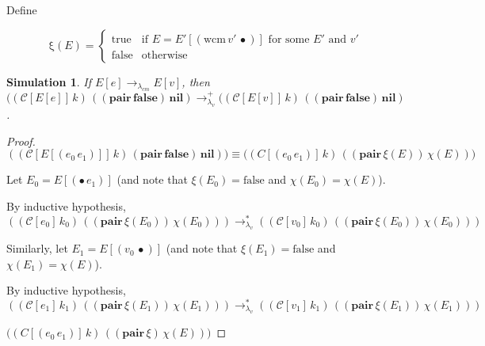 \documentclass[ms,electronic,twosidetoc,letterpaper,chaptercenter,parttop]{byumsphd}
\begin{document}


Define

\[
\mathrm{\xi}(E)=\begin{cases}
\mathrm{true} &\text{if $E=E'[(\mathrm{wcm}\,v'\,\bullet)]$ for some $E'$ and $v'$}\\
\mathrm{false} &\text{otherwise}
\end{cases}
\]

\newtheorem*{simulation}{Simulation}
\begin{simulation}
If $E[e]\rightarrow_{\lambda_{cm}}E[v]$, then $((\mathcal{C}[E[e]]\,k)\,((\mathbf{pair}\,\mathbf{false})\,\mathbf{nil})\rightarrow_{\lambda_v}^{+}((\mathcal{C}[E[v]]\,k)\,((\mathbf{pair}\,\mathbf{false})\,\mathbf{nil})$.
\end{simulation}

\begin{proof}
$((\mathcal{C}[E[(e_0\,e_1)]]\,k)\,(\mathbf{pair}\,\mathbf{false})\,\mathbf{nil}))\equiv\mathcal(({C}[(e_0\,e_1)]\,k)\,((\mathbf{pair}\,\xi(E))\,\chi(E)))$

Let $E_0=E[(\bullet\,e_1)]$ (and note that $\xi(E_0)=\mathrm{false}$ and $\chi(E_0)=\chi(E)$).

By inductive hypothesis, $((\mathcal{C}[e_0]\,k_0)\,((\mathbf{pair}\,\xi(E_0))\,\chi(E_0)))\rightarrow_{\lambda_v}^{*}((\mathcal{C}[v_0]\,k_0)\,((\mathbf{pair}\,\xi(E_0))\,\chi(E_0)))$

Similarly, let $E_1=E[(v_0\,\bullet)]$ (and note that $\xi(E_1)=\mathrm{false}$ and $\chi(E_1)=\chi(E)$).

By inductive hypothesis, $((\mathcal{C}[e_1]\,k_1)\,((\mathbf{pair}\,\xi(E_1))\,\chi(E_1)))\rightarrow_{\lambda_v}^{*}((\mathcal{C}[v_1]\,k_1)\,((\mathbf{pair}\,\xi(E_1))\,\chi(E_1)))$

$\mathcal(({C}[(e_0\,e_1)]\,k)\,((\mathbf{pair}\,\xi)\,\chi(E)))$
\end{proof}
\end{document}
